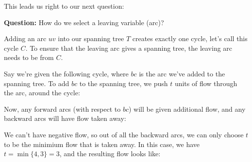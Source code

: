 This leads us right to our next question:

\textbf{Question: }How do we select a leaving variable (arc)?

Adding an arc $uv$ into our spanning tree $T$ creates exactly one cycle, let's call this cycle $C$.
To ensure that the leaving arc gives a spanning tree, the leaving arc needs to be from $C$. 

Say we're given the following cycle, where $bc$ is the arc we've added to the spanning tree. To add $bc$ to the spanning tree, we push  $t$ units of flow through the arc, around the cycle:

\begin{center}
\end{center}

Now, any forward arcs (with respect to $bc$) will be given additional flow, and any backward arcs will have flow taken away:

\begin{center}
\end{center}

We can't have negative flow, so out of all the backward arcs, we can only choose $t$ to be the minimium flow that is taken away. In this case, we have $t = \min\{4, 3\} = 3$, and the resulting flow looks like:

